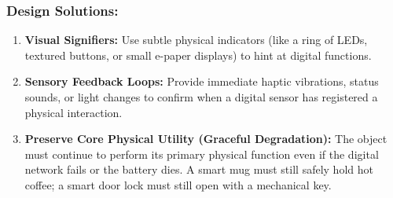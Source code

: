 \subsubsection{Design Solutions:}
\begin{enumerate}
  \item \textbf{Visual Signifiers:} Use subtle physical indicators (like a ring of LEDs, textured buttons, or small e-paper displays) to hint at digital functions.
  \item \textbf{Sensory Feedback Loops:} Provide immediate haptic vibrations, status sounds, or light changes to confirm when a digital sensor has registered a physical interaction.
  \item \textbf{Preserve Core Physical Utility (Graceful Degradation):} The object must continue to perform its primary physical function even if the digital network fails or the battery dies. A smart mug must still safely hold hot coffee; a smart door lock must still open with a mechanical key.
\end{enumerate}
